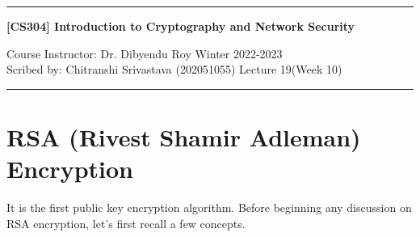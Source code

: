 \documentclass[11pt]{article}
\begin{document}
\noindent
\rule{\textwidth}{1pt}
\begin{center}
{\bf [CS304] Introduction to Cryptography and Network Security}
\end{center}
Course Instructor: Dr. Dibyendu Roy \hfill Winter 2022-2023\\
Scribed by: Chitranshi Srivastava (202051055) \hfill Lecture 19(Week 10)
\\
\rule{\textwidth}{1pt}

\section{RSA (Rivest Shamir Adleman) Encryption}
It is the first public key encryption algorithm. Before beginning any discussion on RSA encryption, let's first recall a few concepts.
\end{document}
